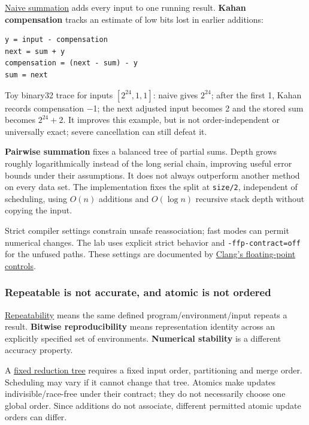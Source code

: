 \hyperref[appendix-df318da57389]{Naive summation} adds every input to one running result. \textbf{Kahan compensation} tracks an estimate of low bits lost in earlier additions:

\begin{verbatim}
y = input - compensation
next = sum + y
compensation = (next - sum) - y
sum = next
\end{verbatim}

Toy binary32 trace for inputs \([2^{24},1,1]\): naive gives \(2^{24}\); after the first 1, Kahan records compensation −1; the next adjusted input becomes 2 and the stored sum becomes \(2^{24}+2\). It improves this example, but is not order-independent or universally exact; severe cancellation can still defeat it.

\textbf{Pairwise summation} fixes a balanced tree of partial sums. Depth grows roughly logarithmically instead of the long serial chain, improving useful error bounds under their assumptions. It does not always outperform another method on every data set. The implementation fixes the split at \texttt{size/2}, independent of scheduling, using \(O(n)\) additions and \(O(\log n)\) recursive stack depth without copying the input.

Strict compiler settings constrain unsafe reassociation; fast modes can permit numerical changes. The lab uses explicit strict behavior and \texttt{-ffp-contract=off} for the unfused paths. These settings are documented by \href{https://clang.llvm.org/docs/UsersManual.html\#controlling-floating-point-behavior}{Clang's floating-point controls}.

\subsubsection{Repeatable is not accurate, and atomic is not ordered}\label{05-engine-i-ch001-repeatable-is-not-accurate-and-atomic-is-not-ordered}

\hyperref[appendix-5f1a2c3f97ff]{Repeatability} means the same defined program/environment/input repeats a result. \textbf{Bitwise reproducibility} means representation identity across an explicitly specified set of environments. \textbf{Numerical stability} is a different accuracy property.

A \hyperref[appendix-4c8e0238e7ee]{fixed reduction tree} requires a fixed input order, partitioning and merge order. Scheduling may vary if it cannot change that tree. Atomics make updates indivisible/race-free under their contract; they do not necessarily choose one global order. Since additions do not associate, different permitted atomic update orders can differ.

